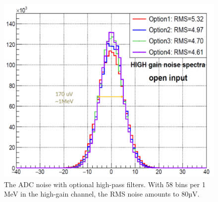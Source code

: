 \documentclass[12pt,a4paper, twocolumn]{article}
\begin{document}
\begin{figure}[htb]
\includegraphics[width=\linewidth]{fig/ADCnoise.pdf}
\caption{The ADC noise with optional high-pass filters. With 58 bins per 1 MeV in the high-gain channel, the RMS noise amounts to 80µV.}
\label{fig:sadc:noise}
\end{figure}
\end{document}
